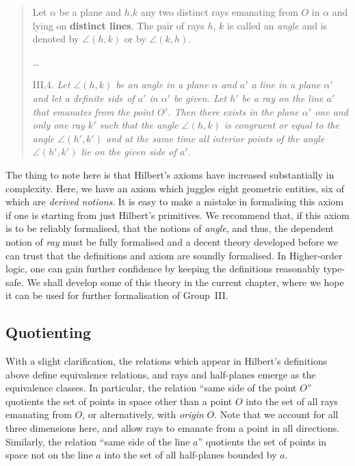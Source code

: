 \begin{quotation}
  Let $\alpha$ be a plane and $h$,$k$ any two distinct rays emanating from $O$ in $\alpha$ and lying on {\bfseries distinct lines}. The pair of rays $h$, $k$ is called an \emph{angle} and is denoted by $\angle(h,k)$ or by $\angle(k,h)$.

\ldots

III,4. \emph{Let $\angle (h,k)$ be an angle in a plane $\alpha$ and $a'$ a line in a plane $\alpha'$ and let a definite side of $a'$ in $\alpha'$ be given. Let $h'$ be a ray on the line $a'$ that emanates from the point $O'$. Then there exists in the plane $\alpha'$ one and only one ray $k'$ such that the angle $\angle (h,k)$ is congruent or equal to the angle $\angle (h',k')$ and at the same time all interior points of the angle $\angle (h',k')$ lie on the given side of $a'$.}
\end{quotation}

The thing to note here is that Hilbert's axioms have increased substantially in complexity. Here, we have an axiom which juggles eight geometric entities, six of which are \emph{derived notions}. It is easy to make a mistake in formalising this axiom if one is starting from just Hilbert's primitives. We recommend that, if this axiom is to be reliably formalised, that the notions of \emph{angle}, and thus, the dependent notion of \emph{ray} must be fully formalised and a decent theory developed before we can trust that the definitions and axiom are soundly formalised. In Higher-order logic, one can gain further confidence by keeping the definitions reasonably type-safe. We shall develop some of this theory in the current chapter, where we hope it can be used for further formalisation of Group~III.

\subsection{Quotienting}
With a slight clarification, the relations which appear in Hilbert's definitions above define equivalence relations, and rays and half-planes emerge as the equivalence classes. In particular, the relation ``same side of the point $O$'' quotients the set of points in space other than a point $O$ into the set of all rays emanating from $O$, or alternatively, with \emph{origin} $O$. Note that we account for all three dimensions here, and allow rays to emanate from a point in all directions. Similarly, the relation ``same side of the line $a$'' quotients the set of points in space not on the line $a$ into the set of all half-planes bounded by $a$. 

